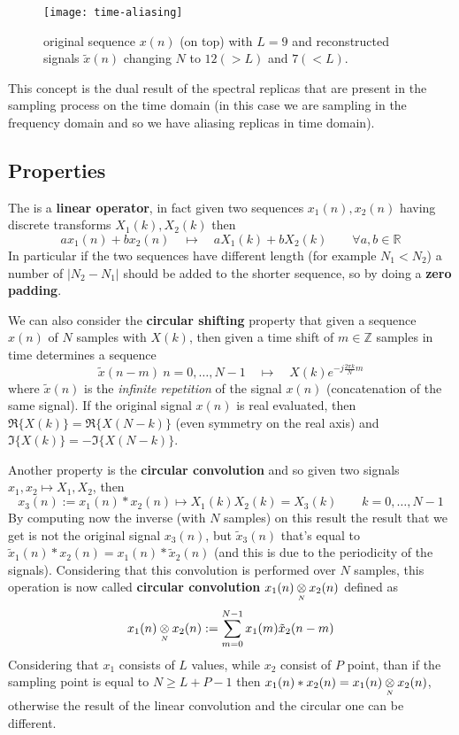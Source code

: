 	\begin{SCfigure}[2][bht]
		\centering \texttt{[image: time-aliasing]}
		\caption{original sequence $x(n)$ (on top) with $L=9$ and reconstructed signals $\tilde x(n)$ changing $N$ to $12 (>L)$ and $7 (<L)$. }
	\end{SCfigure}
	
	This concept is the dual result of the spectral replicas that are present in the sampling process on the time domain (in this case we are sampling in the frequency domain and so we have aliasing replicas in time domain).

\subsection{Properties}
	The \dft is a \textbf{linear operator}, in fact given two sequences $x_1(n),x_2(n)$ having discrete transforms $X_1(k),X_2(k)$ then
	\[ a x_1(n) + b x_2(n) \quad \mapsto \quad a X_1(k) + bX_2(k) \qquad \forall a,b \in \mathds R \]
	In particular if the two sequences have different length (for example $N_1 < N_2$) a number of $|N_2-N_1|$ should be added to the shorter sequence, so by doing a \textbf{zero padding}.
	
	We can also consider the \textbf{circular shifting} property that given a sequence $x(n)$ of $N$ samples with \dft $X(k)$, then given a time shift of $m\in \mathds Z$ samples in time determines a sequence
	\[ \tilde x(n-m) \ n = 0,\dots, N-1\quad \mapsto \quad X(k) e^{-j \frac{2\pi k}{N}m} \]
	where $\tilde x(n)$ is the \textit{infinite repetition} of the signal $x(n)$ (concatenation of the same signal). If the original signal $x(n)$ is real evaluated, then $\Re \{ X(k) \} = \Re \{ X(N-k) \}$ (even symmetry on the real axis) and $\Im \{X(k)\} = - \Im \{X(N-k)\}$. 

	Another property is the \textbf{circular convolution} and so given two signals $x_1,x_2 \mapsto X_1,X_2$, then
	\begin{equation}
		x_3(n):=x_1(n) * x_2(n) \mapsto X_1(k)X_2(k)  = X_3(k) \qquad k = 0,\dots, N-1
	\end{equation}
	By computing now the inverse \dft (with $N$ samples) on this result the result that we get is not the original signal $x_3(n)$, but $\tilde x_3(n)$ that's equal to $\tilde x_1(n) * x_2(n) = x_1(n) * \tilde x_2(n)$ (and this is due to the periodicity of the signals). Considering that this convolution is performed over $N$ samples, this operation is now called \textbf{circular convolution} $x_1(n) \underset{\text{\tiny $N$}} \otimes x_2(n)$ defined as
	\begin{equation}
		x_1(n) \underset{\text{\tiny $N$}} \otimes x_2(n) : = \sum_{m=0}^{N-1} x_1(m) \tilde x_2(n-m)
	\end{equation}
	Considering that $x_1$ consists of $L$ values, while $x_2$ consist of $P$ point, than if the \dft sampling point is equal to $N \geq L + P - 1$ then $x_1(n) * x_2(n) = x_1(n) \underset{\text{\tiny $N$}} \otimes x_2(n)$, otherwise the result of the linear convolution and the circular one can be different.
	
